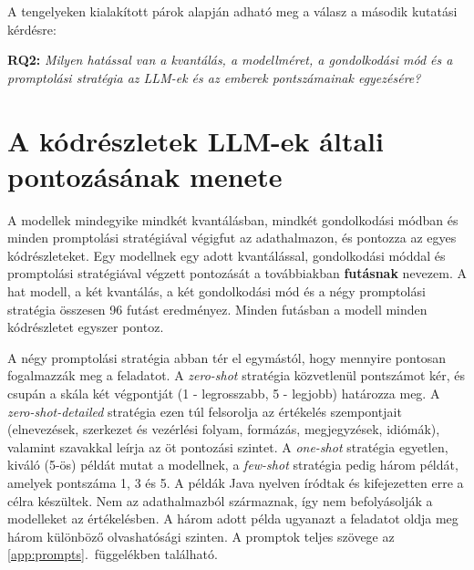 \documentclass[
]{elteikthesis}[2024/04/26]
\begin{document}
A tengelyeken kialakított párok alapján adható meg a válasz a második kutatási
kérdésre:

\textbf{RQ2:} \textit{Milyen hatással van a kvantálás, a modellméret, a
gondolkodási mód és a promptolási stratégia az LLM-ek és az emberek
pontszámainak egyezésére?} %

\section{A kódrészletek LLM-ek általi pontozásának menete}
\label{sec:method:judging}

A modellek mindegyike mindkét kvantálásban, mindkét gondolkodási módban és
minden promptolási stratégiával végigfut az adathalmazon, és pontozza az egyes
kódrészleteket. Egy modellnek egy adott kvantálással, gondolkodási móddal és
promptolási stratégiával végzett pontozását a továbbiakban \textbf{futásnak}
nevezem. A hat modell, a két kvantálás, a két gondolkodási mód és a négy
promptolási stratégia összesen 96 futást eredményez. Minden futásban a modell
minden kódrészletet egyszer pontoz.

A négy promptolási stratégia abban tér el egymástól, hogy mennyire pontosan
fogalmazzák meg a feladatot. A \textit{zero-shot} stratégia közvetlenül
pontszámot kér, és csupán a skála két végpontját (1 - legrosszabb, 5 - legjobb)
határozza meg. A \textit{zero-shot-detailed} stratégia ezen túl felsorolja az
értékelés szempontjait (elnevezések, szerkezet és vezérlési folyam, formázás,
megjegyzések, idiómák), valamint szavakkal leírja az öt pontozási szintet. A
\textit{one-shot} stratégia egyetlen, kiváló (5-ös) példát mutat a modellnek, a
\textit{few-shot} stratégia pedig három példát, amelyek pontszáma 1, 3 és 5. A
példák Java nyelven íródtak és kifejezetten erre a célra készültek. Nem az
adathalmazból származnak, így nem befolyásolják a modelleket az értékelésben. %
A három adott példa ugyanazt a feladatot oldja meg három különböző olvashatósági
szinten. A promptok teljes szövege %
az \ref{app:prompts}.~függelékben található.
\end{document}
